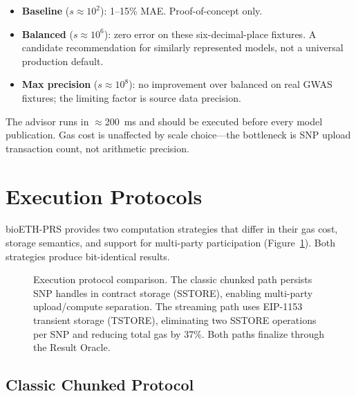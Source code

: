 \documentclass[10pt,twocolumn]{article}
\begin{document}
\begin{itemize}
  \item \textbf{Baseline} ($s \approx 10^2$): 1--15\% MAE. Proof-of-concept only.
  \item \textbf{Balanced} ($s \approx 10^6$): zero error on these six-decimal-place
        fixtures.  A candidate recommendation for similarly represented models, not a
        universal production default.
  \item \textbf{Max precision} ($s \approx 10^8$): no improvement over balanced
        on real GWAS fixtures; the limiting factor is source data precision.
\end{itemize}

The advisor runs in $\approx$200~ms and should be executed before every model
publication.  Gas cost is unaffected by scale choice---the bottleneck is SNP upload
transaction count, not arithmetic precision.

\section{Execution Protocols}
\label{sec:execution}

bioETH-PRS provides two computation strategies that differ in their gas cost,
storage semantics, and support for multi-party participation
(Figure~\ref{fig:protocol}).  Both strategies produce bit-identical results.

\begin{figure}[t]
  \centering
  \caption{Execution protocol comparison.  The classic chunked path persists SNP
  handles in contract storage (SSTORE), enabling multi-party upload/compute
  separation.  The streaming path uses EIP-1153 transient storage (TSTORE),
  eliminating two SSTORE operations per SNP and reducing total gas by 37\%.  Both
  paths finalize through the Result Oracle.}
  \label{fig:protocol}
\end{figure}

\subsection{Classic Chunked Protocol}
\end{document}
